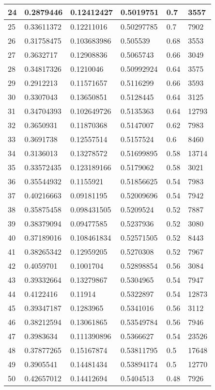 \begin{longtable}{|l|l|l|l|l|l|}
24 & 0.2879446 & 0.12412427 & 0.5019751 & 0.7 & 3557 \\ \hline 
25 & 0.33611372 & 0.12211016 & 0.50297785 & 0.7 & 7902 \\ \hline 
26 & 0.31758475 & 0.103683986 & 0.505539 & 0.68 & 3553 \\ \hline 
27 & 0.3632717 & 0.12908836 & 0.5065743 & 0.66 & 3049 \\ \hline 
28 & 0.34817326 & 0.1210046 & 0.50992924 & 0.64 & 3575 \\ \hline 
29 & 0.2912213 & 0.11571657 & 0.5116299 & 0.66 & 3593 \\ \hline 
30 & 0.3307043 & 0.13650851 & 0.5128445 & 0.64 & 3125 \\ \hline 
31 & 0.34704393 & 0.102649726 & 0.5135363 & 0.64 & 12793 \\ \hline 
32 & 0.3650931 & 0.11870368 & 0.5147007 & 0.62 & 7983 \\ \hline 
33 & 0.3691738 & 0.12557514 & 0.5157524 & 0.6 & 8460 \\ \hline 
34 & 0.3136013 & 0.13278572 & 0.51699895 & 0.58 & 13714 \\ \hline 
35 & 0.33572435 & 0.123189166 & 0.5179062 & 0.58 & 3021 \\ \hline 
36 & 0.35544932 & 0.1155921 & 0.51856625 & 0.54 & 7983 \\ \hline 
37 & 0.40216663 & 0.09181195 & 0.52009696 & 0.54 & 7942 \\ \hline 
38 & 0.35875458 & 0.098431505 & 0.5209524 & 0.52 & 7887 \\ \hline 
39 & 0.38379094 & 0.09477585 & 0.5237936 & 0.52 & 3080 \\ \hline 
40 & 0.37189016 & 0.108461834 & 0.52571505 & 0.52 & 8443 \\ \hline 
41 & 0.38265342 & 0.12959205 & 0.5270308 & 0.52 & 7967 \\ \hline 
42 & 0.4059701 & 0.1001704 & 0.52898854 & 0.56 & 3084 \\ \hline 
43 & 0.39332664 & 0.13279867 & 0.5304965 & 0.54 & 7947 \\ \hline 
44 & 0.4122416 & 0.11914 & 0.5322897 & 0.54 & 12873 \\ \hline 
45 & 0.39347187 & 0.1283965 & 0.5341016 & 0.56 & 3112 \\ \hline 
46 & 0.38212594 & 0.13061865 & 0.53549784 & 0.56 & 7946 \\ \hline 
47 & 0.3983634 & 0.111390896 & 0.5366627 & 0.54 & 23526 \\ \hline 
48 & 0.37877265 & 0.15167874 & 0.53811795 & 0.5 & 17648 \\ \hline 
49 & 0.3905541 & 0.14481434 & 0.53894174 & 0.5 & 12770 \\ \hline 
50 & 0.42657012 & 0.14412694 & 0.5404513 & 0.48 & 7926 \\ \hline 
\end{longtable}